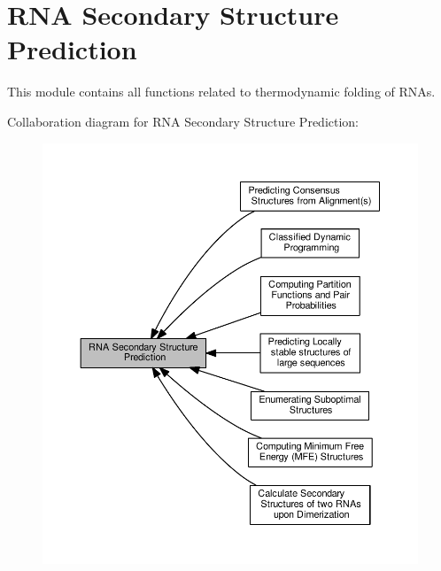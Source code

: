 \hypertarget{group__folding__routines}{}\section{R\+N\+A Secondary Structure Prediction}
\label{group__folding__routines}


This module contains all functions related to thermodynamic folding of R\+N\+As.  


Collaboration diagram for R\+N\+A Secondary Structure Prediction\+:
\nopagebreak
\begin{figure}[H]
\begin{center}
\leavevmode
\includegraphics[width=350pt]{group__folding__routines}
\end{center}
\end{figure}
